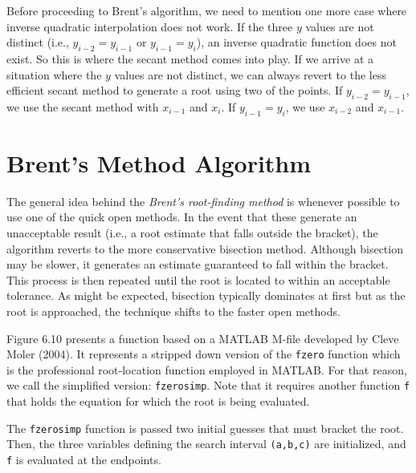 \documentclass[../main.tex]{subfiles}
\begin{document}
Before proceeding to Brent's algorithm, we need to mention one more case where
inverse quadratic interpolation does not work. If the three $y$ values are not distinct (i.e.,
$y_{i-2} = y_{i-1}$ or $y_{i-1} = y_i$), an inverse quadratic function does not exist. So this is where the
secant method comes into play. If we arrive at a situation where the $y$ values are not distinct,
we can always revert to the less efficient secant method to generate a root using two of
the points. If $y_{i-2} = y_{i-1}$, we use the secant method with $x_{i-1}$ and $x_i$. If $y_{i-1} = y_i$, we use $x_{i-2}$
and $x_{i-1}$.
\newpage

\section{Brent's Method Algorithm}
\noindent The general idea behind the \emph{Brent's root-finding method} is whenever possible to use one of
the quick open methods. In the event that these generate an unacceptable result (i.e., a root
estimate that falls outside the bracket), the algorithm reverts to the more conservative
bisection method. Although bisection may be slower, it generates an estimate guaranteed to
fall within the bracket. This process is then repeated until the root is located to within an
acceptable tolerance. As might be expected, bisection typically dominates at first but as the
root is approached, the technique shifts to the faster open methods.

Figure 6.10 presents a function based on a MATLAB M-file developed by Cleve
Moler (2004). It represents a stripped down version of the \texttt{fzero} function which is the professional
root-location function employed in MATLAB. For that reason, we call the
simplified version: \texttt{fzerosimp}. Note that it requires another function \texttt{f} that holds the
equation for which the root is being evaluated.

The \texttt{fzerosimp} function is passed two initial guesses that must bracket the root.
Then, the three variables defining the search interval \texttt{(a,b,c)} are initialized, and \texttt{f} is evaluated
at the endpoints.\\
\end{document}
